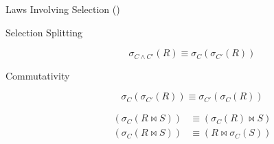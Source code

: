 \begin{frame}{}
  \centerline{\Large Laws Involving Selection ()}

  \vspace{0.50cm}
  \begin{description}
    \item[Selection Splitting]
      \[
	\sigma_{C \land C'}(R) \equiv \sigma_{C}(\sigma_{C'}(R))
      \]
    \item[Commutativity] 
      \[
	\sigma_{C}(\sigma_{C'}(R)) \equiv \sigma_{C'}(\sigma_{C}(R))
      \]
      \pause
    \item[] 
      \begin{align*}
	(\sigma_C(R \bowtie S)) &\equiv (\sigma_{C}(R) \bowtie S) \\
	(\sigma_C(R \bowtie S)) &\equiv (R \bowtie \sigma_{C}(S))
      \end{align*}
  \end{description}
\end{frame}





